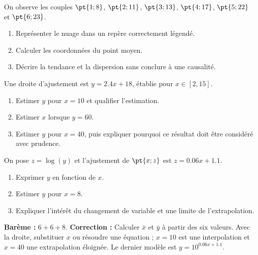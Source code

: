 \begin{exercise}
On observe les couples $\pt{1;8}$, $\pt{2;11}$, $\pt{3;13}$, $\pt{4;17}$, $\pt{5;22}$ et $\pt{6;23}$.
\begin{enumerate}
\item Représenter le nuage dans un repère correctement légendé.
\item Calculer les coordonnées du point moyen.
\item Décrire la tendance et la dispersion sans conclure à une causalité.
\end{enumerate}
\end{exercise}
\begin{exercise}
Une droite d'ajustement est $y=\num{2,4}x+18$, établie pour $x\in[2,15]$.
\begin{enumerate}
\item Estimer $y$ pour $x=10$ et qualifier l'estimation.
\item Estimer $x$ lorsque $y=60$.
\item Estimer $y$ pour $x=40$, puis expliquer pourquoi ce résultat doit être considéré avec prudence.
\end{enumerate}
\end{exercise}
\begin{exercise}
On pose $z=\log(y)$ et l'ajustement de $\pt{x;z}$ est $z=\num{0,06}x+\num{1,1}$.
\begin{enumerate}
\item Exprimer $y$ en fonction de $x$.
\item Estimer $y$ pour $x=8$.
\item Expliquer l'intérêt du changement de variable et une limite de l'extrapolation.
\end{enumerate}
\end{exercise}
\begin{solution}\textbf{Barème :} $6+6+8$. \textbf{Correction :} Calculer $\bar x$ et $\bar y$ à partir des six valeurs. Avec la droite, substituer $x$ ou résoudre une équation ; $x=10$ est une interpolation et $x=40$ une extrapolation éloignée. Le dernier modèle est $y=10^{\num{0,06}x+\num{1,1}}$.\end{solution}

